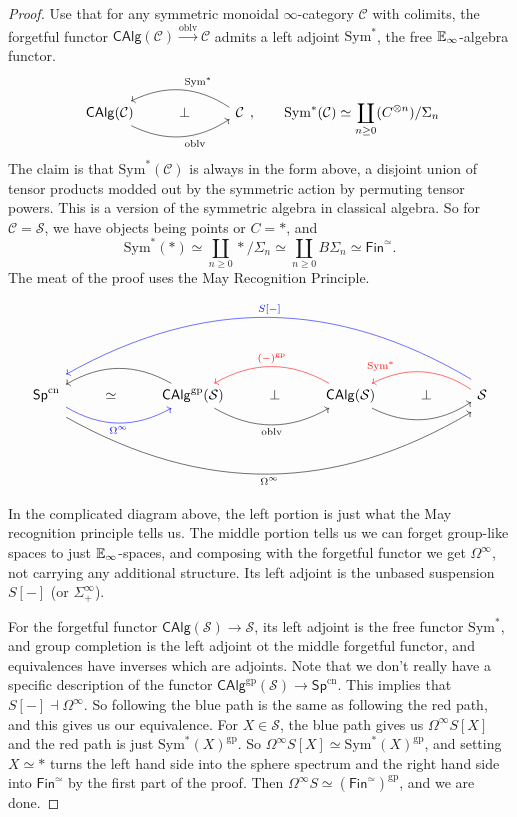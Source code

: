 \begin{proof}
    Use that for any symmetric monoidal $\infty$-category $\mathcal{C} $ with colimits, the forgetful functor $\mathsf{CAlg}(\mathcal{C} ) \xrightarrow{\mathrm{oblv}} \mathcal{C}  $ admits a left adjoint $\mathrm{Sym}^*$, the free $\mathbb{E}_{\infty}$-algebra functor.
\[
\begin{tikzcd}
    \mathsf{CAlg} (\mathcal{C} ) \arrow[rr, "\mathrm{oblv}"', bend right] & \perp & \mathcal{C} \arrow[ll,"\mathrm{Sym}^*"',bend right]
\end{tikzcd},\qquad \mathrm{Sym}^* (\mathcal{C} )\simeq  \coprod _{n\geq 0}(C^{\otimes n}) / \Sigma_n 
\] 
    The claim is that $\mathrm{Sym}^*(\mathcal{C} )$ is always in the form above, a disjoint union of tensor products modded out by the symmetric action by permuting tensor powers. This is a version of the symmetric algebra in classical algebra. So for $\mathcal{C} =\mathcal{S} $, we have objects being points or $C=*$, and \[
        \mathrm{Sym}^*(*)\simeq \coprod _{n\geq 0}* / \Sigma_n \simeq  \coprod _{n \geq 0}B \Sigma_n  \simeq  \mathsf{Fin} ^{\simeq }.
    \] The meat of the proof uses the May Recognition Principle.
\[
\begin{tikzcd}
    \mathsf{Sp} ^{\mathrm{cn}} \arrow[rr,"\Omega^{\infty}"',blue, bend right]\arrow[rrrrrr, "\Omega^{\infty}"',bend right,shift right=3]& \simeq  & \mathsf{CAlg} ^{\mathrm{gp}}(\mathcal{S} )\arrow[ll,bend right]\arrow[rr, "\mathrm{oblv}"', bend right] & \perp & \mathsf{CAlg} (\mathcal{S} ) \arrow[ll,"(-)^{\mathrm{gp}}"',red,bend right]\arrow[rr,bend right] & \perp & \mathcal{S} \arrow[ll, "\mathrm{Sym}^*"', red,bend right,near end]\arrow[llllll,"S\lbrack -\rbrack"',blue,bend right, shift right=3]
\end{tikzcd}
\] 
In the complicated diagram above, the left portion is just what the May recognition principle tells us. The middle portion tells us we can forget group-like spaces to just $\mathbb{E}_{\infty}$-spaces, and composing with the forgetful functor we get $\Omega^{\infty}$, not carrying any additional structure. Its left adjoint is the unbased suspension $S[-]$ (or $\Sigma^{\infty}_+$). 

For the forgetful functor $\mathsf{CAlg} (\mathcal{S} ) \to  \mathcal{S} $, its left adjoint is the free functor $\mathrm{Sym}^*$, and group completion is the left adjoint ot the middle forgetful functor, and equivalences have inverses which are adjoints. Note that we don't really have a specific description of the functor $\mathsf{CAlg} ^{\mathrm{gp}}(\mathcal{S} ) \to \mathsf{Sp} ^{\mathrm{cn}}$. This implies that $S[-]\dashv \Omega^{\infty}$. So following the blue path is the same as following the red path, and this gives us our equivalence. For $X \in \mathcal{S} $, the blue path gives us $\Omega^{\infty}S[X]$ and the red path is just $\mathrm{Sym}^*(X)^{\mathrm{gp}}.$ So $\Omega^{\infty}S[X] \simeq  \mathrm{Sym}^*(X)^{\mathrm{gp}}$, and setting $X\simeq  *$ turns the left hand side into the sphere spectrum and the right hand side into $\mathsf{Fin} ^{\simeq }$ by the first part of the proof. Then $\Omega^{\infty}S \simeq (\mathsf{Fin} ^{\simeq })^{\mathrm{gp}}$, and we are done.
\end{proof}

